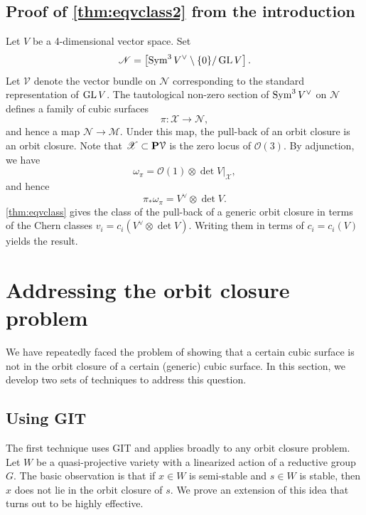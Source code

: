 \documentclass[12pt,reqno]{amsart}
\renewcommand{\to}{{\longrightarrow}}
\numberwithin{equation}{section}
\renewcommand{\O}{\mathcal O}
\begin{document}
\subsection{Proof of \texorpdfstring{\autoref{thm:eqvclass2}}{second theorem} from the introduction}\label{proof:eqvclass2}
Let $V$ be a 4-dimensional vector space.
Set
\[\mathscr N = \left[ \Sym^3V^\vee \setminus \{0\} / \GL V \right]. \]
Let $\mathcal V$ denote the vector bundle on $\mathscr N$ corresponding to the standard representation of $\GL V$.
The tautological non-zero section of $\Sym^3V^\vee$ on $\mathscr N$ defines a family of cubic surfaces
\[ \pi \colon \mathscr X \to \mathscr N,\]
and hence a map $\mathscr N \to \mathscr M$.
Under this map, the pull-back of an orbit closure is an orbit closure.
Note that $\mathscr X \subset \P \mathcal V$ is the zero locus of $\O(3)$.
By adjunction, we have
\[ \omega_\pi = \O(1) \otimes \det V |_{\mathscr X},\]
and hence
\[ \pi_* \omega_\pi = V^\vee \otimes \det V.\]
\autoref{thm:eqvclass} gives the class of the pull-back of a generic orbit closure in terms of the Chern classes $v_i = c_i(V^\vee \otimes \det V)$.
Writing them in terms of $c_i = c_i(V)$ yields the result.

\section{Addressing the orbit closure problem}
\label{sec:orbclosure}
We have repeatedly faced the problem of showing that a certain cubic surface is not in the orbit closure of a certain (generic) cubic surface.
In this section, we develop two sets of techniques to address this question.

\subsection{Using GIT}
The first technique uses GIT and applies broadly to any orbit closure problem.
Let $W$ be a quasi-projective variety with a linearized action of a reductive group $G$.
The basic observation is that if $x \in W$ is semi-stable and $s \in W$ is stable, then $x$ does not lie in the orbit closure of $s$.
We prove an extension of this idea that turns out to be highly effective.
\end{document}
